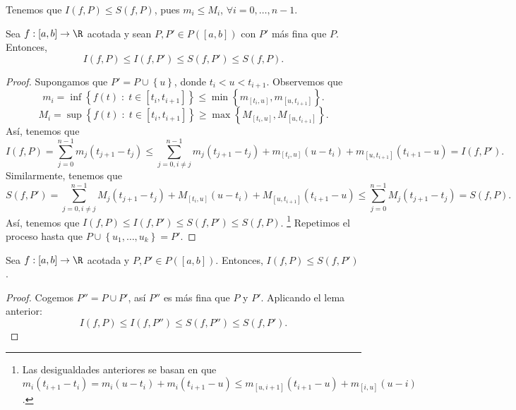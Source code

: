 \begin{observation}
\normalfont Tenemos que $\displaystyle I\left(f,P\right) \leq S\left(f,P\right) $, pues $\displaystyle m_{i} \leq M_{i} $, $\displaystyle \forall i = 0, \ldots, n-1 $.
\end{observation}
\begin{flema}[]
	\normalfont Sea $\displaystyle f : \left[a,b\right] \to \R $ acotada y sean $\displaystyle P,P' \in P\left([a,b]\right) $ con $\displaystyle P' $ más fina que $\displaystyle P $. Entonces, 
	\[ I\left(f,P\right) \leq I\left(f,P'\right) \leq S\left(f,P'\right) \leq S\left(f,P\right) .\]
\end{flema}
\begin{proof}
	Supongamos que $\displaystyle P' = P \cup \left\{ u\right\}  $, donde $\displaystyle t_{i} < u < t_{i+1} $. Observemos que 
	\[ m_{i} = \inf \left\{ f\left(t\right) \; : \; t \in \left[t_{i}, t_{i+1}\right] \right\} \leq \min \left\{ m_{[t_{i}, u]}, m_{[u, t_{i+1}]}\right\} 
	.\]
\[ M_{i} = \sup \left\{ f\left(t\right) \; : \; t \in \left[t_{i}, t_{i+1}\right] \right\} \geq \max \left\{ M_{[t_{i}, u]}, M_{[u, t_{i+1}]}\right\}.\]
Así, tenemos que 
\[ I\left(f, P\right)= \sum^{n-1}_{j = 0}m_{j}\left(t_{j+1}-t_{j}\right) \leq \sum^{n-1}_{j=0, i \neq j} m_{j}\left(t_{j+1}-t_{j}\right) + m_{[t_{i},u]}\left(u-t_{i}\right) + m_{[u,t_{i+1}]}\left(t_{i+1}-u\right) = I\left(f,P'\right).\]
Similarmente, tenemos que 
\[ S\left(f,P'\right) = \sum^{n-1}_{j=0,i\neq j}M_{j}\left(t_{j+1}-t_{j}\right) + M_{[t_{i}, u]}\left(u-t_{i}\right) + M_{[u,t_{i+1}]}\left(t_{i+1}-u\right) \leq \sum^{n-1}_{j=0}M_{j}\left(t_{j+1}-t_{j}\right) = S\left(f,P\right) .\]
Así, tenemos que $\displaystyle I\left(f,P\right) \leq I\left(f,P'\right) \leq S\left(f,P'\right) \leq S\left(f,P\right) $. \footnote{Las desigualdades anteriores se basan en que $\displaystyle m_{i}\left(t_{i+1}-t_{i}\right) = m_{i}\left(u - t_{i}\right) + m_{i}\left(t_{i+1}-u\right) \leq m_{[u,i+1]}\left(t_{i+1}-u\right) + m_{[i,u]}\left(u-i\right) $. } 
Repetimos el proceso hasta que $\displaystyle P \cup \left\{ u_{1}, \ldots, u_{k}\right\} = P' $.
\end{proof}
\begin{flema}[]
	\normalfont Sea $\displaystyle f: [a,b] \to \R$ acotada y $\displaystyle P,P' \in P\left([a,b]\right) $. Entonces, $\displaystyle I\left(f, P\right) \leq S\left(f, P'\right) $.
\end{flema}
\begin{proof}
Cogemos $\displaystyle P'' = P \cup P' $, así $\displaystyle P'' $ es más fina que $\displaystyle P $ y $\displaystyle P' $. Aplicando el lema anterior:
\[ I\left(f,P\right) \leq I\left(f,P''\right) \leq S\left(f,P''\right) \leq S\left(f,P'\right) .\]
\end{proof}

